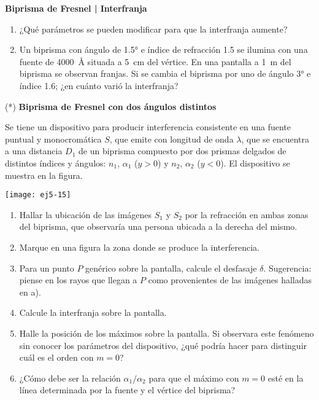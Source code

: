 \item
\textbf{Biprisma de Fresnel | Interfranja}
\begin{enumerate}
\item ¿Qué parámetros se pueden modificar para que la interfranja aumente?
\item Un biprisma con ángulo de \ang{1.5;;} e índice de refracción \num{1.5} se ilumina con una fuente de \SI{4000}{\angstrom} situada a \SI{5}{\centi\metre} del vértice.
En una pantalla a \SI{1}{\metre} del biprisma se observan franjas.
Si se cambia el biprisma por uno de ángulo \ang{3;;} e índice \num{1.6}; ¿en cuánto varió la interfranja?
\end{enumerate}



\item 
(*) \textbf{Biprisma de Fresnel con dos ángulos distintos}\\
\begin{minipage}[t][2cm]{0.6\textwidth}
Se tiene un dispositivo para producir interferencia consistente en una fuente puntual y monocromática $S$, que emite con longitud de onda $\lambda$, que se encuentra a una distancia $D_1$ de un biprisma compuesto por dos prismas delgados de distintos índices y ángulos: $n_1$, $\alpha_1$ ($y>0$) y $n_2$, $\alpha_2$ ($y<0$).
El dispositivo se muestra en la figura.
\end{minipage}
\begin{minipage}[c][4.5cm][t]{0.35\textwidth}
	\texttt{[image: ej5-15]}
\end{minipage}
\begin{enumerate}
	\item Hallar la ubicación de las imágenes $S_1$ y $S_2$ por la refracción en ambas zonas del biprisma, que observaría una persona ubicada a la derecha del mismo. 
	\item Marque en una figura la zona donde se produce la interferencia.
	\item Para un punto $P$ genérico sobre la pantalla, calcule el desfasaje $\delta$. Sugerencia: piense en los rayos que llegan a $P$ como provenientes de las imágenes halladas en a).
	\item Calcule la interfranja sobre la pantalla. 
	\item Halle la posición de los máximos sobre la pantalla.
	Si observara este fenómeno sin conocer los parámetros del dispositivo, ¿qué podría hacer para distinguir cuál es el orden con $m = 0$? 
	\item ¿Cómo debe ser la relación $\alpha_1/\alpha_2$ para que el máximo con $m = 0$ esté en la línea determinada por la fuente y el vértice del biprisma?
\end{enumerate}
